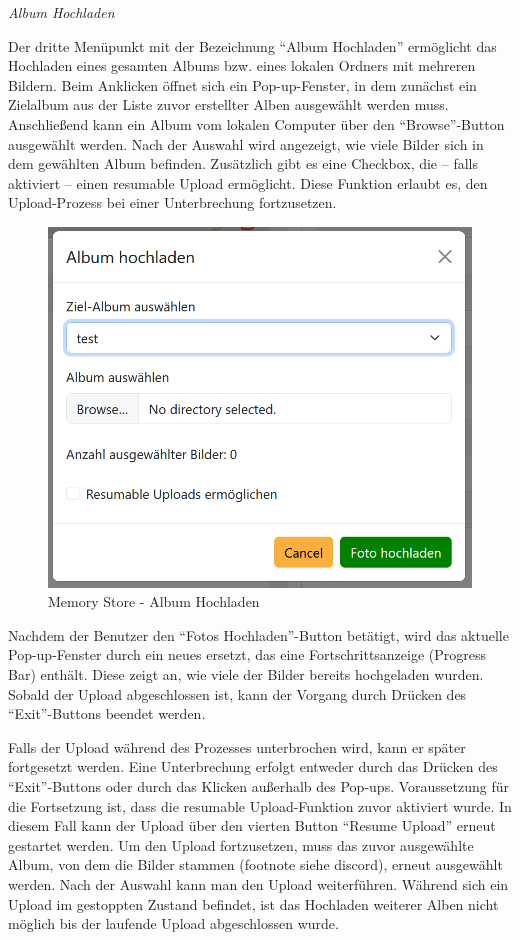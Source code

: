 \emph{Album Hochladen}


Der dritte Menüpunkt mit der Bezeichnung ``Album Hochladen'' ermöglicht das 
Hochladen eines gesamten Albums bzw. eines lokalen Ordners mit mehreren Bildern. 
Beim Anklicken öffnet sich ein Pop-up-Fenster, in dem zunächst ein Zielalbum aus 
der Liste zuvor erstellter Alben ausgewählt werden muss. Anschlie\ss{}end kann ein 
Album vom lokalen Computer über den ``Browse''-Button ausgewählt werden. Nach der 
Auswahl wird angezeigt, wie viele Bilder sich in dem gewählten Album befinden. 
Zusätzlich gibt es eine Checkbox, die – falls aktiviert – einen resumable Upload 
ermöglicht. Diese Funktion erlaubt es, den Upload-Prozess bei einer Unterbrechung 
fortzusetzen.

\begin{figure}
    \centering
    \includegraphics[scale=0.4]{pics/memory_store_teil1_button3.PNG}
    \caption{Memory Store - Album Hochladen}
    \label{fig:memory-store-album-hochladen}
\end{figure}

Nachdem der Benutzer den ``Fotos Hochladen''-Button betätigt, wird das aktuelle 
Pop-up-Fenster durch ein neues ersetzt, das eine Fortschrittsanzeige (Progress Bar) 
enthält. Diese zeigt an, wie viele der Bilder bereits hochgeladen wurden. Sobald 
der Upload abgeschlossen ist, kann der Vorgang durch Drücken des ``Exit''-Buttons 
beendet werden.

Falls der Upload während des Prozesses unterbrochen wird, kann er später fortgesetzt 
werden. Eine Unterbrechung erfolgt entweder durch das Drücken des ``Exit''-Buttons 
oder durch das Klicken au\ss{}erhalb des Pop-ups. Voraussetzung für die Fortsetzung ist, 
dass die resumable Upload-Funktion zuvor aktiviert wurde. In diesem Fall kann der 
Upload über den vierten Button ``Resume Upload'' erneut gestartet werden. Um den 
Upload fortzusetzen, muss das zuvor ausgewählte Album, von dem die Bilder stammen 
(footnote siehe discord), erneut ausgewählt werden. Nach der Auswahl kann man den 
Upload weiterführen. Während sich ein Upload im gestoppten Zustand befindet, ist das 
Hochladen weiterer Alben nicht möglich bis der laufende Upload abgeschlossen wurde.

